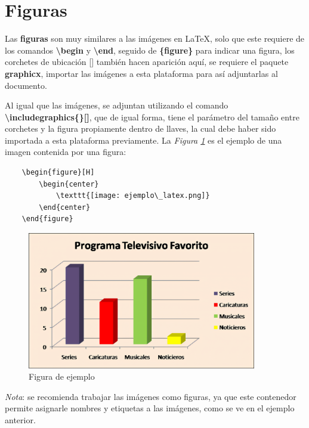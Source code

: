 \section{Figuras}

Las \textbf{figuras} son muy similares a las imágenes en \LaTeX, solo que este requiere de los comandos \textbf{\textbackslash{begin}} y \textbf{\textbackslash{end}}, seguido de \textbf{\{figure\}} para indicar una figura, los corchetes de ubicación [] también hacen aparición aquí, se requiere el paquete \textbf{graphicx}, importar las imágenes a esta plataforma para así adjuntarlas al documento.

Al igual que las imágenes, se adjuntan utilizando el comando \textbf{\textbackslash{includegraphics\{\}[]}}, que de igual forma, tiene el parámetro del tamaño entre corchetes y la figura propiamente dentro de llaves, la cual debe haber sido importada a esta plataforma previamente. La \textit{Figura \ref{fig: 4}} es el ejemplo de una imagen contenida por una figura:
\begin{lstlisting}
    \begin{figure}[H]
        \begin{center}
            \texttt{[image: ejemplo\_latex.png]}
        \end{center}
    \end{figure}
\end{lstlisting}
\begin{figure}[H]
    \begin{center}
        \caption{Figura de ejemplo}
        \label{fig: 4}
        \includegraphics[width=10cm]{recursos/ejemplo_latex.png}
    \end{center}
\end{figure}

\textit{Nota}: se recomienda trabajar las imágenes como figuras, ya que este contenedor permite asignarle nombres y etiquetas a las imágenes, como se ve en el ejemplo anterior.



